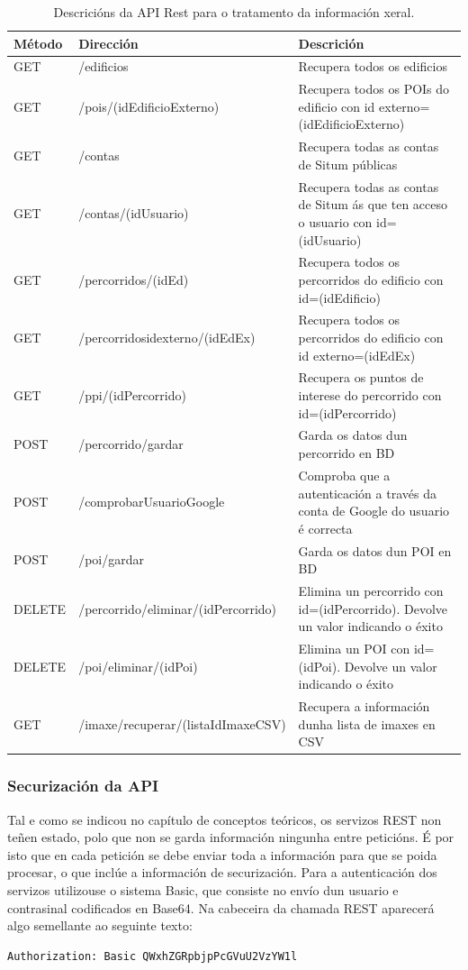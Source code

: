 \begin{table} [tbh]
	\begin{tabular}{|l|p{6cm}|p{6cm}|}
		\hline 
		\textbf{Método}	& \textbf{Dirección} & \textbf{Descrición} \\ 
		\hline 
		GET & /edificios & Recupera todos os edificios \\ 
		\hline 
		GET & /pois/(idEdificioExterno) & Recupera todos os POIs do edificio con id externo=(idEdificioExterno) \\ 
		\hline 
		GET & /contas & Recupera todas as contas de Situm públicas \\ 
		\hline 
		GET & /contas/(idUsuario) & Recupera todas as contas de Situm ás que ten acceso o usuario con id=(idUsuario) \\ 
		\hline 
		GET & /percorridos/(idEd) & Recupera todos os percorridos do edificio con id=(idEdificio) \\ 
		\hline 
		GET & /percorridosidexterno/(idEdEx) & Recupera todos os percorridos do edificio con id externo=(idEdEx) \\ 
		\hline 
		GET & /ppi/(idPercorrido) & Recupera os puntos de interese do percorrido con id=(idPercorrido) \\ 
		\hline 
		POST & /percorrido/gardar & Garda os datos dun percorrido en BD \\ 
		\hline 
		POST & /comprobarUsuarioGoogle & Comproba que a autenticación a través da conta de Google do usuario é correcta \\ 
		\hline 
		POST & /poi/gardar & Garda os datos dun POI en BD \\ 
		\hline 
		DELETE & /percorrido/eliminar/(idPercorrido) & Elimina un percorrido con id=(idPercorrido). Devolve un valor indicando o éxito \\ 
		\hline 
		DELETE & /poi/eliminar/(idPoi) & Elimina un POI con id=(idPoi). Devolve un valor indicando o éxito \\ 
		\hline 
		GET & /imaxe/recuperar/(listaIdImaxeCSV) & Recupera a información dunha lista de imaxes en CSV \\ 
		\hline 
	\end{tabular}
	\caption{Descricións da API Rest para o tratamento da información xeral.}
	\label{tab:APIXeral}
\end{table}

\subsubsection{Securización da API}
Tal e como se indicou no capítulo de conceptos teóricos, os servizos REST non teñen estado, polo que non se garda información ningunha entre peticións. É por isto que en cada petición se debe enviar toda a información para que se poida procesar, o que inclúe a información de securización.
Para a autenticación dos servizos utilizouse o sistema Basic, que consiste no envío dun usuario e contrasinal codificados en Base64. Na cabeceira da chamada REST aparecerá algo semellante ao seguinte texto:
\begin{lstlisting}
Authorization: Basic QWxhZGRpbjpPcGVuU2VzYW1l
\end{lstlisting}

